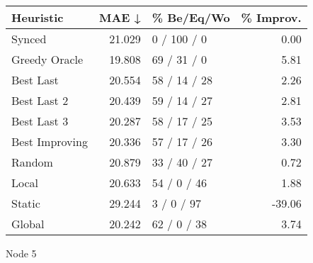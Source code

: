 \begin{tabular}{lrlr}
\toprule
\textbf{Heuristic} & \textbf{MAE ↓} & \textbf{\% Be/Eq/Wo} & \textbf{\% Improv.} \\
\midrule
            Synced &         21.029 &          0 / 100 / 0 &                0.00 \\
     Greedy Oracle &         19.808 &          69 / 31 / 0 &                5.81 \\
         Best Last &         20.554 &         58 / 14 / 28 &                2.26 \\
       Best Last 2 &         20.439 &         59 / 14 / 27 &                2.81 \\
       Best Last 3 &         20.287 &         58 / 17 / 25 &                3.53 \\
    Best Improving &         20.336 &         57 / 17 / 26 &                3.30 \\
            Random &         20.879 &         33 / 40 / 27 &                0.72 \\
             Local &         20.633 &          54 / 0 / 46 &                1.88 \\
            Static &         29.244 &           3 / 0 / 97 &              -39.06 \\
            Global &         20.242 &          62 / 0 / 38 &                3.74 \\
\bottomrule
\end{tabular}
\caption{Node 5}
\label{tab:non_lr05_le2_bs4_5}
